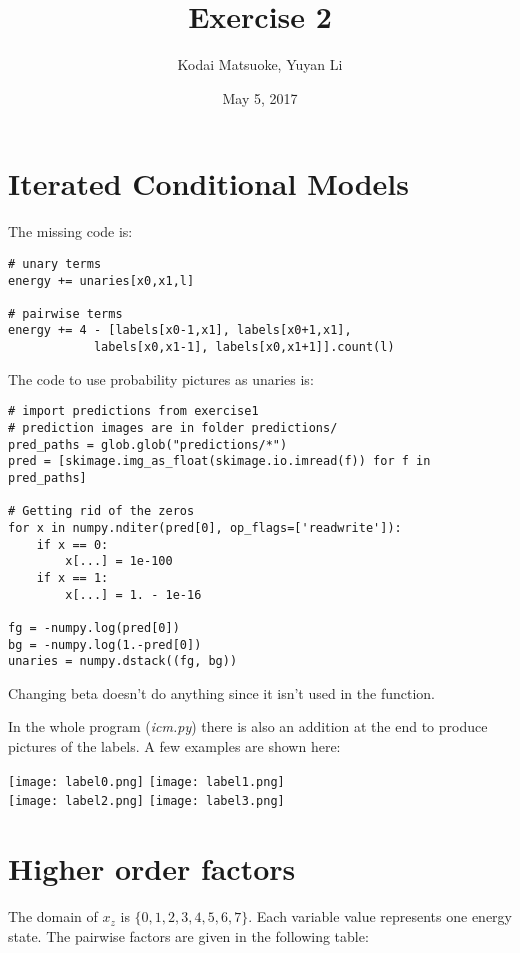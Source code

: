\documentclass[12pt,a4paper]{scrartcl}
\author{Kodai Matsuoke, Yuyan Li}
\title{Exercise 2}
\date{May 5, 2017}
\begin{document}
\maketitle

\section{Iterated Conditional Models}

The missing code is:

\begin{verbatim}
# unary terms
energy += unaries[x0,x1,l]

# pairwise terms
energy += 4 - [labels[x0-1,x1], labels[x0+1,x1],
            labels[x0,x1-1], labels[x0,x1+1]].count(l)
\end{verbatim}

The code to use probability pictures as unaries is:

\begin{verbatim}
# import predictions from exercise1
# prediction images are in folder predictions/
pred_paths = glob.glob("predictions/*")
pred = [skimage.img_as_float(skimage.io.imread(f)) for f in pred_paths]

# Getting rid of the zeros
for x in numpy.nditer(pred[0], op_flags=['readwrite']):
    if x == 0:
        x[...] = 1e-100
    if x == 1:
        x[...] = 1. - 1e-16

fg = -numpy.log(pred[0])
bg = -numpy.log(1.-pred[0])
unaries = numpy.dstack((fg, bg))
\end{verbatim}

Changing beta doesn't do anything since it isn't used in the function.

In the whole program (\textit{icm.py}) there is also an addition at the end to produce pictures of the labels. A few examples are shown here:

\texttt{[image: label0.png]}
\texttt{[image: label1.png]}
\\
\texttt{[image: label2.png]}
\texttt{[image: label3.png]}
\\
% 

\section{Higher order factors}
The domain of $x_z$ is $\{0,1,2,3,4,5,6,7\}$. Each variable value represents one energy state. The pairwise factors are given in the following table:
\end{document}
